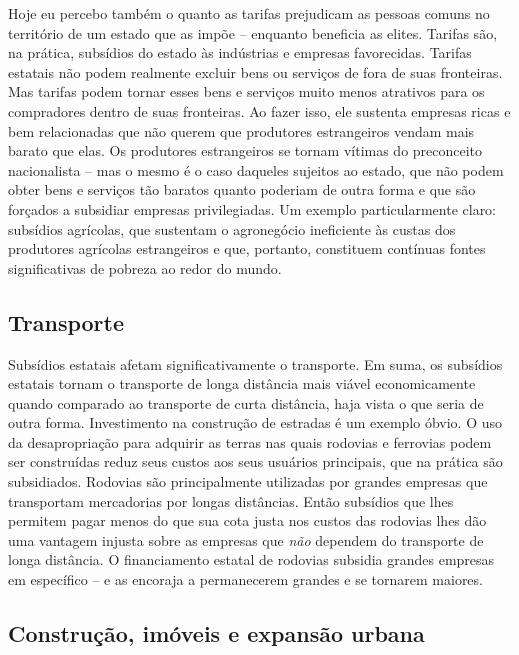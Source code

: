 Hoje eu percebo também o quanto as tarifas prejudicam as pessoas comuns no território de um estado que as impõe -- enquanto beneficia as elites. Tarifas são, na prática, subsídios do estado às indústrias e empresas favorecidas. Tarifas estatais não podem realmente excluir bens ou serviços de fora de suas fronteiras. Mas tarifas podem tornar esses bens e serviços muito menos atrativos para os compradores dentro de suas fronteiras. Ao fazer isso, ele sustenta empresas ricas e bem relacionadas que não querem que produtores estrangeiros vendam mais barato que elas. Os produtores estrangeiros se tornam vítimas do preconceito nacionalista -- mas o mesmo é o caso daqueles sujeitos ao estado, que não podem obter bens e serviços tão baratos quanto poderiam de outra forma e que são forçados a subsidiar empresas privilegiadas. Um exemplo particularmente claro: subsídios agrícolas, que sustentam o agronegócio ineficiente às custas dos produtores agrícolas estrangeiros e que, portanto, constituem contínuas fontes significativas de pobreza ao redor do mundo.

\subsection*{Transporte}

Subsídios estatais afetam significativamente o transporte. Em suma, os subsídios estatais tornam o transporte de longa distância mais viável economicamente quando comparado ao transporte de curta distância, haja vista o que seria de outra forma. Investimento na construção de estradas é um exemplo óbvio. O uso da desapropriação para adquirir as terras nas quais rodovias e ferrovias podem ser construídas reduz seus custos aos seus usuários principais, que na prática são subsidiados. Rodovias são principalmente utilizadas por grandes empresas que transportam mercadorias por longas distâncias. Então subsídios que lhes permitem pagar menos do que sua cota justa nos custos das rodovias lhes dão uma vantagem injusta sobre as empresas que \emph{não} dependem do transporte de longa distância. O financiamento estatal de rodovias subsidia grandes empresas em específico -- e as encoraja a permanecerem grandes e se tornarem maiores.

\subsection*{Construção, imóveis e expansão urbana}

